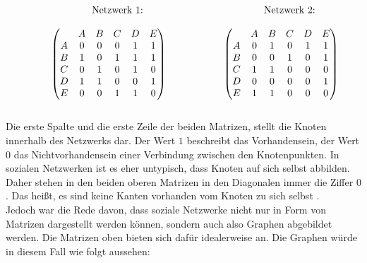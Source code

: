 \[
    \begin{array}{ccc} 
        \text{\hspace{-5.5cm}Netzwerk 1:} & \text{\hspace{-3cm}Netzwerk 2:} \\[\normalbaselineskip]
\begin{pmatrix}
& A & B & C & D & E\\
A & 0 & 0 & 0 & 1 & 1 \\
B & 1 & 0 & 1 & 1 & 1 \\
C & 0 & 1 & 0 & 1 & 0 \\
D & 1 & 1 & 0 & 0 & 1 \\
E & 0 & 0 & 1 & 1 & 0 \\
\end{pmatrix}
\hspace{2cm}
\begin{pmatrix}
& A & B & C & D & E\\
A & 0 & 1 & 0 & 1 & 1 \\
B & 0 & 0 & 1 & 0 & 1 \\
C & 1 & 1 & 0 & 0 & 0 \\
D & 0 & 0 & 0 & 0 & 1 \\
E & 1 & 1 & 0 & 0 & 0 \\
\end{pmatrix}
 \end{array} 
\]
\\
Die erste Spalte und die erste Zeile der beiden Matrizen, stellt die Knoten innerhalb des Netzwerks dar. Der Wert $1$ beschreibt das Vorhandensein, der Wert $0$ das Nichtvorhandensein einer Verbindung zwischen den Knotenpunkten. In sozialen Netzwerken ist es eher untypisch, dass Knoten auf sich selbst abbilden. Daher stehen in den beiden oberen Matrizen in den Diagonalen immer die Ziffer $0$. Das heißt, es sind keine Kanten vorhanden vom Knoten zu sich selbst \cite{wasserman1994social}.\\
Jedoch war die Rede davon, dass soziale Netzwerke nicht nur in Form von Matrizen dargestellt werden können, sondern auch also Graphen abgebildet werden.
Die Matrizen oben bieten sich dafür idealerweise an. 
Die Graphen würde in diesem Fall wie folgt aussehen: 
